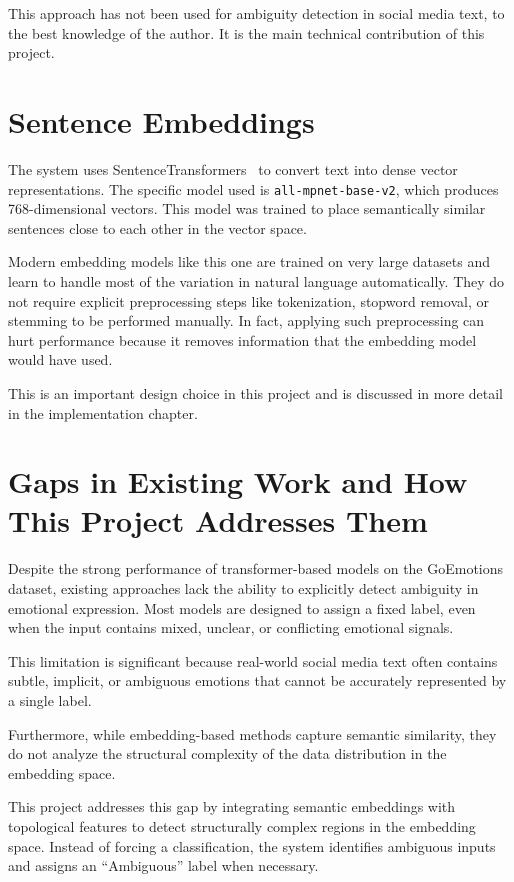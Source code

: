 This approach has not been used for ambiguity detection in social media text, to the best
knowledge of the author. It is the main technical contribution of this project.

\section{Sentence Embeddings}

The system uses SentenceTransformers~\cite{sentence_bert} to convert text into dense vector representations.
The specific model used is \texttt{all-mpnet-base-v2}, which produces 768-dimensional vectors.
This model was trained to place semantically similar sentences close to each other in the vector
space.

Modern embedding models like this one are trained on very large datasets and learn to handle
most of the variation in natural language automatically. They do not require explicit
preprocessing steps like tokenization, stopword removal, or stemming to be performed manually.
In fact, applying such preprocessing can hurt performance because it removes information that
the embedding model would have used.

This is an important design choice in this project and is discussed in more detail in the
implementation chapter.

\section{Gaps in Existing Work and How This Project Addresses Them}

Despite the strong performance of transformer-based models on the GoEmotions dataset, existing approaches lack the ability to explicitly detect ambiguity in emotional expression. Most models are designed to assign a fixed label, even when the input contains mixed, unclear, or conflicting emotional signals.

This limitation is significant because real-world social media text often contains subtle, implicit, or ambiguous emotions that cannot be accurately represented by a single label.

Furthermore, while embedding-based methods capture semantic similarity, they do not analyze the structural complexity of the data distribution in the embedding space.

This project addresses this gap by integrating semantic embeddings with topological features to detect structurally complex regions in the embedding space. Instead of forcing a classification, the system identifies ambiguous inputs and assigns an ``Ambiguous'' label when necessary.
